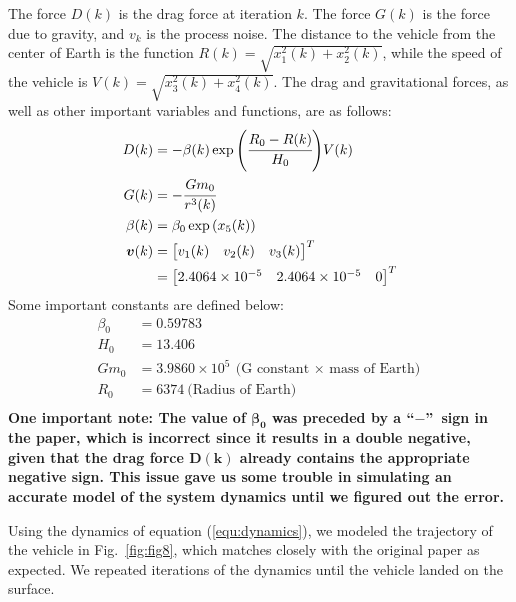 \documentclass[]{article}
\begin{document}
The force $D(k)$ is the drag force at iteration $k$. The force $G(k)$ is the force due to gravity, and $v_{k}$ is the process noise. The distance to the vehicle from the center of Earth is the function $R(k) = \sqrt{x_{1}^{2}(k) + x_{2}^{2}(k)}$, while the speed of the vehicle is $V(k) = \sqrt{x_{3}^{2}(k) + x_{4}^{2}(k)}$. The drag and gravitational forces, as well as other important variables and functions, are as follows:
\begin{equation}
\begin{split}
    D(k) & = -\beta(k) \exp{\left( \cfrac{R_{0} - R(k)}{H_{0}} \right)} V(k) \\
    G(k) & = -\cfrac{Gm_{0}}{r^{3}(k)} \\
    \beta (k) & = \beta_{0}\exp{(x_{5}(k))} \\
    \boldsymbol{v}(k) & = \begin{bmatrix} v_{1}(k) & v_{2}(k) & v_{3}(k) \end{bmatrix}^{T} \\
        & = \begin{bmatrix} 2.4064 \times 10^{-5} & 2.4064 \times 10^{-5} & 0 \end{bmatrix}^{T}
\end{split}
\label{equ:drag_gravity}
\end{equation}
Some important constants are defined below:
\begin{equation}
\begin{split}
    \beta_{0} & = 0.59783 \\
    H_{0} & = 13.406 \\
    Gm_{0} & = 3.9860 \times 10^{5}\ \text{(G constant $\times$ mass of Earth)} \\
    R_{0} & = 6374\ \text{(Radius of Earth)} \\
\end{split}
\label{equ:constants}
\end{equation}
\textbf{One important note: The value of $\boldsymbol{\beta_{0}}$ was preceded by a \textquotedblleft$\boldsymbol{-}$\textquotedblright\ sign in the paper, which is incorrect since it results in a double negative, given that the drag force $\boldsymbol{D(k)}$ already contains the appropriate negative sign. This issue gave us some trouble in simulating an accurate model of the system dynamics until we figured out the error.}

Using the dynamics of equation (\ref{equ:dynamics}), we modeled the trajectory of the vehicle in Fig.~\ref{fig:fig8}, which matches closely with the original paper as expected. We repeated iterations of the dynamics until the vehicle landed on the surface.
\end{document}
